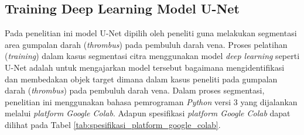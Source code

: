 {%
\subsection{Training Deep Learning Model U-Net}
Pada penelitian ini model U-Net dipilih oleh peneliti guna melakukan segmentasi area gumpalan darah (\textit{thrombus}) pada pembuluh darah vena. Proses pelatihan (\textit{training}) dalam kasus segmentasi citra menggunakan model \textit{deep learning} seperti U-Net adalah untuk mengajarkan model tersebut bagaimana mengidentifikasi dan membedakan objek target dimana dalam kasus peneliti pada gumpalan darah (\textit{thrombus}) pada pembuluh darah vena. Dalam proses segmentasi, penelitian ini menggunakan bahasa pemrograman \textit{Python} versi 3 yang dijalankan melalui \textit{platform Google Colab}. Adapun spesifikasi \textit{platform Google Colab} dapat dilihat pada Tabel \ref{tab:spesifikasi_platform_google_colab}.


\begin{table}[htbp]
	\centering
	\caption{Spesifikasi platform Google Colab}
	\label{tab:spesifikasi_platform_google_colab}
\end{table}

}
